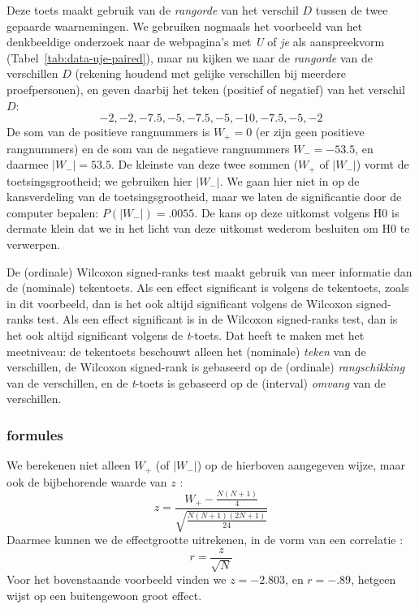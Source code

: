 \documentclass[
]{book}
\begin{document}
Deze toets maakt gebruik van de \emph{rangorde} van het verschil \(D\) tussen
de twee gepaarde waarnemingen. We gebruiken nogmaals het voorbeeld van
het denkbeeldige onderzoek naar de webpagina's met \emph{U} of \emph{je} als
aanspreekvorm
(Tabel~\ref{tab:data-uje-paired}), maar nu kijken we naar de \emph{rangorde}
van de verschillen \(D\) (rekening houdend met gelijke verschillen bij
meerdere proefpersonen), en geven daarbij het teken (positief of
negatief) van het verschil \(D\):
\[-2, -2, -7.5, -5, -7.5, -5, -10, -7.5, -5, -2\]
De som van de positieve rangnummers is \(W_+=0\) (er zijn geen positieve rangnummers)
en de som van de negatieve rangnummers \(W_-= -53.5\), en daarmee \(|W_-|=53.5\). De kleinste van
deze twee sommen (\(W_+\) of \(|W_-|\)) vormt de toetsingsgrootheid; we gebruiken hier \(|W_-|\).
We gaan
hier niet in op de kansverdeling van de toetsingsgrootheid, maar we
laten de significantie door de computer bepalen: \(P(|W_-|)=.0055\). De kans
op deze uitkomst volgens H0 is dermate klein dat we in het licht van
deze uitkomst wederom besluiten om H0 te verwerpen.

De (ordinale) Wilcoxon signed-ranks test maakt gebruik van meer
informatie dan de (nominale) tekentoets. Als een effect significant is
volgens de tekentoets, zoals in dit voorbeeld, dan is het ook altijd
significant volgens de Wilcoxon signed-ranks test. Als een effect
significant is in de Wilcoxon signed-ranks test, dan is het ook altijd
significant volgens de \emph{t}-toets. Dat heeft te maken met het meetniveau: de
tekentoets beschouwt alleen het (nominale) \emph{teken} van de verschillen, de
Wilcoxon signed-rank is gebaseerd op de (ordinale) \emph{rangschikking} van de
verschillen, en de \emph{t}-toets is gebaseerd op de (interval) \emph{omvang} van de
verschillen.

\hypertarget{formules-6}{%
\subsubsection{formules}\label{formules-6}}

We berekenen niet alleen \(W_+\) (of \(|W_-|\)) op de hierboven aangegeven wijze,
maar ook de bijbehorende waarde van \(z\) \citep{Ferg89}:
\begin{equation}
  \label{eq:Wilcoxon-signedrank-z}
  z = \frac{ W_+ - \frac{N(N+1)}{4} } { \sqrt{ \frac{N(N+1)(2N+1)}{24} } }
\end{equation}
Daarmee kunnen we de effectgrootte uitrekenen, in de vorm van een
correlatie \citep[ Eq.2.18]{Rose91}:
\begin{equation}
  \label{eq:es-z2r}
    r = \frac {z} {\sqrt{N}}
\end{equation}
Voor het bovenstaande voorbeeld vinden we
\(z=-2.803\), en \(r=-.89\), hetgeen wijst op een buitengewoon groot effect.
\end{document}
